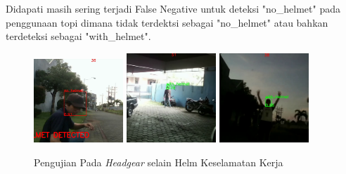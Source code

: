 Didapati masih sering terjadi False Negative untuk deteksi "no\_helmet" pada penggunaan topi dimana tidak terdektsi sebagai "no\_helmet" atau bahkan terdeteksi sebagai "with\_helmet".

\begin{figure} [h!]
  \centering
  \includegraphics[width=0.3\textwidth]{gambar/pengujian/Screenshot_105.png}
  \includegraphics[width=0.3\textwidth]{gambar/pengujian/Screenshot_106.png}
  \includegraphics[width=0.3\textwidth]{gambar/pengujian/Screenshot_107.png}
  \caption{Pengujian Pada \emph{Headgear} selain Helm Keselamatan Kerja}
  \label{fig:pengujian_headgear}  
\end{figure}



